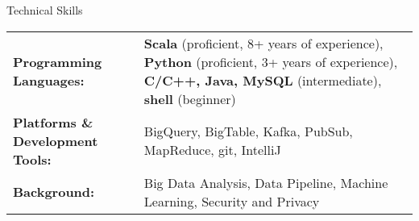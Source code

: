 \documentclass[11pt,oneside]{article}
\newenvironment{ressection_empty}[1]{
	\vspace{-1pt}
	{\fontfamily{phv}\selectfont\Large#1}
	
	\vspace{-8pt} \rule{\textwidth}{.5pt}
}
\newcommand{\resitem}[1]{
	\vspace{2pt}
	\item \begin{flushleft} #1 \end{flushleft}
}
\begin{document}
\vspace{5pt}
\begin{ressection_empty}{Technical Skills}
\vspace{-10pt}
\begin{table}[H]
\begin{tabular}[h]{p{}p{}}
\textbf{Programming Languages:} & \textbf{Scala} (proficient, 8+ years of experience), \textbf{Python} (proficient, 3+ years of experience), \textbf{C/C++, Java, MySQL} (intermediate), \textbf{shell} (beginner)	\\[1.5pt]
\textbf{Platforms \& Development Tools:} & BigQuery, BigTable, Kafka, PubSub, MapReduce, git, IntelliJ  \\[1.5pt]
\textbf{Background:} & Big Data Analysis, Data Pipeline, Machine Learning, Security and Privacy \\
\end{tabular}
\end{table}
\vspace{-8pt}



\end{ressection_empty}
\end{document}
